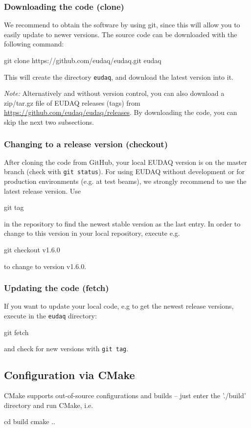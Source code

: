 \subsubsection{Downloading the code (clone)}
We recommend to obtain the software by using git,
since this will allow you to easily update to newer versions.
The source code can be downloaded with the following command:
\begin{listing}[mybash]
git clone https://github.com/eudaq/eudaq.git eudaq
\end{listing}
This will create the directory \texttt{eudaq}, and download the latest
version into it. 

\textit{Note:} Alternatively and without version control, you can also download a zip/tar.gz file of EUDAQ releases (tags) from \url{https://github.com/eudaq/eudaq/releases}. 
By downloading the code, you can skip the next two subsections. 

\subsubsection{Changing to a release version (checkout)}
After cloning the code from GitHub, your local EUDAQ version is on the master branch (check with \texttt{git status}).  
For using EUDAQ without development or for production environments (e.g. at test beams), we strongly recommend to use the latest release version. 
Use 
\begin{listing}[mybash]
git tag 
\end{listing}
in the repository to find the newest stable version as the last entry.
In order to change to this version in your local repository, execute e.g. 
\begin{listing}[mybash]
git checkout v1.6.0
\end{listing}
to change to version v1.6.0.

\subsubsection{Updating the code (fetch)}
If you want to update your local code, e.g to get the newest release versions, execute in the \texttt{eudaq} directory: 
\begin{listing}[mybash]
git fetch
\end{listing}
and check for new versions with \texttt{git tag}. 


\subsection{Configuration via CMake}
CMake supports out-of-source configurations and builds -- just enter
the './build' directory and run CMake, i.e.
\begin{listing}[mybash]
cd build
cmake ..
\end{listing}

